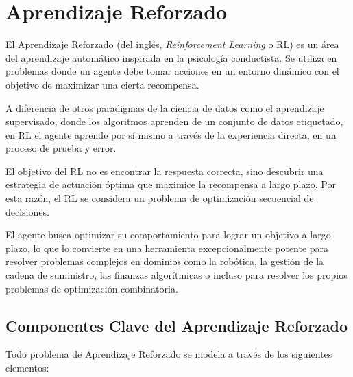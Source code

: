 \documentclass[12pt,a4paper]{book}
\begin{document}
\section{Aprendizaje Reforzado}

El Aprendizaje Reforzado \citep{intro_reforzado} (del inglés, \textit{Reinforcement Learning} o RL) es un área del aprendizaje automático inspirada en la psicología conductista. Se utiliza en problemas donde un agente debe tomar acciones en un entorno dinámico con el objetivo de maximizar una cierta recompensa.

A diferencia de otros paradigmas de la ciencia de datos como el aprendizaje supervisado, donde los algoritmos aprenden de un conjunto de datos etiquetado, en RL el agente aprende por sí mismo a través de la experiencia directa, en un proceso de prueba y error. 

El objetivo del RL no es encontrar la respuesta correcta, sino descubrir una estrategia de actuación óptima que maximice la recompensa a largo plazo. Por esta razón, el RL se considera un problema de optimización secuencial de decisiones.

El agente busca optimizar su comportamiento para lograr un objetivo a largo plazo, lo que lo convierte en una herramienta excepcionalmente potente para resolver problemas complejos en dominios como la robótica, la gestión de la cadena de suministro, las finanzas algorítmicas o incluso para resolver los propios problemas de optimización combinatoria.

\subsection{Componentes Clave del Aprendizaje Reforzado}

Todo problema de Aprendizaje Reforzado se modela a través de los siguientes elementos:
\end{document}

